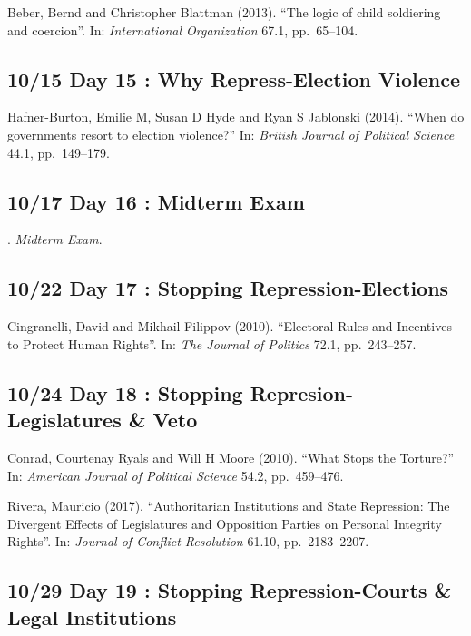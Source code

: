 \documentclass[11pt,]{article}
\begin{document}
Beber, Bernd and Christopher Blattman (2013). ``The logic of child
soldiering and coercion''. In: \emph{International Organization} 67.1,
pp.~65--104.

\hypertarget{day-15-why-repress-election-violence}{%
\subsection{10/15 Day 15 : Why Repress-Election
Violence}\label{day-15-why-repress-election-violence}}

Hafner-Burton, Emilie M, Susan D Hyde and Ryan S Jablonski (2014).
``When do governments resort to election violence?'' In:
\emph{British Journal of Political Science} 44.1, pp.~149--179.

\hypertarget{day-16-midterm-exam}{%
\subsection{10/17 Day 16 : Midterm Exam}\label{day-16-midterm-exam}}

. \emph{Midterm Exam}.

\hypertarget{day-17-stopping-repression-elections}{%
\subsection{10/22 Day 17 : Stopping
Repression-Elections}\label{day-17-stopping-repression-elections}}

Cingranelli, David and Mikhail Filippov (2010). ``Electoral Rules and
Incentives to Protect Human Rights''. In: \emph{The Journal of Politics}
72.1, pp.~243--257.

\hypertarget{day-18-stopping-represion-legislatures-veto}{%
\subsection{10/24 Day 18 : Stopping Represion-Legislatures \&
Veto}\label{day-18-stopping-represion-legislatures-veto}}

Conrad, Courtenay Ryals and Will H Moore (2010). ``What Stops the
Torture?'' In: \emph{American Journal of Political Science} 54.2,
pp.~459--476.

Rivera, Mauricio (2017). ``Authoritarian Institutions and State
Repression: The Divergent Effects of Legislatures and Opposition Parties
on Personal Integrity Rights''. In:
\emph{Journal of Conflict Resolution} 61.10, pp.~2183--2207.

\hypertarget{day-19-stopping-repression-courts-legal-institutions}{%
\subsection{10/29 Day 19 : Stopping Repression-Courts \& Legal
Institutions}\label{day-19-stopping-repression-courts-legal-institutions}}
\end{document}

